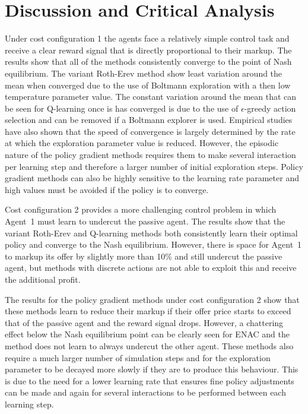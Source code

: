 \section{Discussion and Critical Analysis}
Under cost configuration 1 the agents face a relatively simple control task and
receive a clear reward signal that is directly proportional to their markup. The
results show that all of the methods consistently converge to the point of Nash
equilibrium.  The variant Roth-Erev method show least variation around the mean
when converged due to the use of Boltmann exploration with a then low
temperature parameter value.  The constant variation around the mean that can be
seen for Q-learning once is has converged is due to the use of $\epsilon$-greedy
action selection and can be removed if a Boltmann explorer is used.  Empirical
studies have also shown that the speed of convergence is largely determined by
the rate at which the exploration parameter value is reduced.  However, the
episodic nature of the policy gradient methods requires them to make several
interaction per learning step and therefore a larger number of initial
exploration steps.  Policy gradient methods can also be highly sensitive to
the learning rate parameter and high values must be avoided if the policy is
to converge.

Cost configuration 2 provides a more challenging control problem in which
Agent~1 must learn to undercut the passive agent.  The results show that the
variant Roth-Erev and Q-learning methods both consistently learn their optimal
policy and converge to the Nash equilibrium.  However, there is space for
Agent~1 to markup its offer by slightly more than 10\% and still undercut the
passive agent, but methods with discrete actions are not able to exploit this
and receive the additional profit.

The results for the policy gradient methods under cost configuration 2 show that
these methods learn to reduce their markup if their offer price starts to exceed
that of the passive agent and the reward signal drops.  However, a chattering
effect below the Nash equilibrium point can be clearly seen for ENAC and the method
does not learn to always undercut the other agent.  These methods also require
a much larger number of simulation steps and for the exploration parameter to
be decayed more slowly if they are to produce this behaviour.  This is
due to the need for a lower learning rate that ensures fine policy
adjustments can be made and again for several interactions to be performed between each learning
step.

